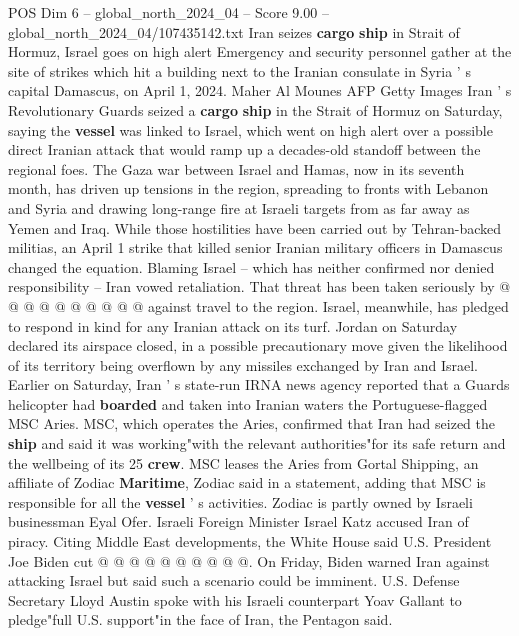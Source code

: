 \begin{textsample}{POS Dim 6 – global\_north\_2024\_04 – Score 9.00 – global\_north\_2024\_04/107435142.txt}  \label{ex:f6_pos_111}
Iran seizes \textbf{cargo} \textbf{ship} in Strait of Hormuz, Israel goes on high alert Emergency and security personnel gather at the site of strikes which hit a building next to the Iranian consulate in Syria ' s capital Damascus, on April 1, 2024.
Maher Al Mounes AFP Getty Images Iran ' s Revolutionary Guards seized a \textbf{cargo} \textbf{ship} in the Strait of Hormuz on Saturday, saying the \textbf{vessel} was linked to Israel, which went on high alert over a possible direct Iranian attack that would ramp up a decades-old standoff between the regional foes.
The Gaza war between Israel and Hamas, now in its seventh month, has driven up tensions in the region, spreading to fronts with Lebanon and Syria and drawing long-range fire at Israeli targets from as far away as Yemen and Iraq.
While those hostilities have been carried out by Tehran-backed militias, an April 1 strike that killed senior Iranian military officers in Damascus changed the equation.
Blaming Israel -- which has neither confirmed nor denied responsibility -- Iran vowed retaliation.
That threat has been taken seriously by @ @ @ @ @ @ @ @ @ @ against travel to the region.
Israel, meanwhile, has pledged to respond in kind for any Iranian attack on its turf.
Jordan on Saturday declared its airspace closed, in a possible precautionary move given the likelihood of its territory being overflown by any missiles exchanged by Iran and Israel.
Earlier on Saturday, Iran ' s state-run IRNA news agency reported that a Guards helicopter had \textbf{boarded} and taken into Iranian waters the Portuguese-flagged MSC Aries.
MSC, which operates the Aries, confirmed that Iran had seized the \textbf{ship} and said it was working"with the relevant authorities"for its safe return and the wellbeing of its 25 \textbf{crew}.
MSC leases the Aries from Gortal Shipping, an affiliate of Zodiac \textbf{Maritime}, Zodiac said in a statement, adding that MSC is responsible for all the \textbf{vessel} ' s activities.
Zodiac is partly owned by Israeli businessman Eyal Ofer.
Israeli Foreign Minister Israel Katz accused Iran of piracy.
Citing Middle East developments, the White House said U.S.
President Joe Biden cut @ @ @ @ @ @ @ @ @ @.
On Friday, Biden warned Iran against attacking Israel but said such a scenario could be imminent.
U.S.
Defense Secretary Lloyd Austin spoke with his Israeli counterpart Yoav Gallant to pledge"full U.S. support"in the face of Iran, the Pentagon said.

\end{textsample}
